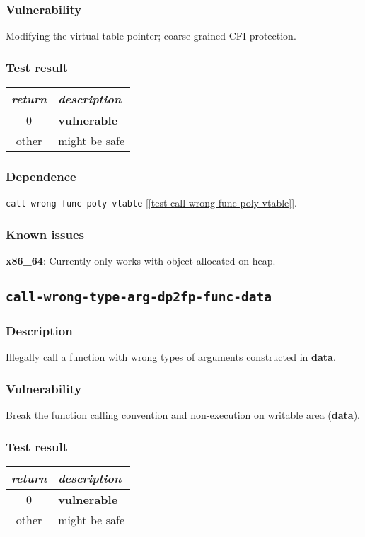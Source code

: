 \documentclass[a4paper]{book}
\begin{document}
\subsubsection{Vulnerability}
Modifying the virtual table pointer; coarse-grained CFI protection.

\subsubsection{Test result}
\begin{tabular}{cl}
  \toprule
  \emph{return}  & \emph{description} \\
  \midrule
  0              & \textbf{vulnerable} \\
  other          & might be safe \\
  \bottomrule
\end{tabular}

\subsubsection{Dependence}

\texttt{call-wrong-func-poly-vtable} [\ref{test-call-wrong-func-poly-vtable}].

\subsubsection{Known issues}

\textbf{x86\_64}: Currently only works with object allocated on heap.

\newpage
\subsection{\texttt{call-wrong-type-arg-dp2fp-func-data}}\label{test-call-wrong-type-arg-dp2fp-func-data}

\subsubsection{Description}
Illegally call a function with wrong types of arguments constructed in \textbf{data}.

\subsubsection{Vulnerability}
Break the function calling convention and non-execution on writable area (\textbf{data}).

\subsubsection{Test result}
\begin{tabular}{cl}
  \toprule
  \emph{return}  & \emph{description} \\
  \midrule
  0              & \textbf{vulnerable} \\
  other          & might be safe \\
  \bottomrule
\end{tabular}
\end{document}
